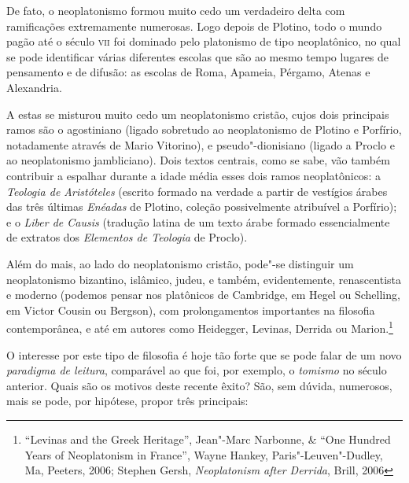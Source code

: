 De fato, o neoplatonismo formou muito cedo um verdadeiro delta com
ramificações extremamente numerosas. Logo depois de Plotino, todo o
mundo pagão até o século \textsc{vii} foi dominado pelo platonismo de tipo
neoplatônico, no qual se pode identificar várias diferentes escolas
que são ao mesmo tempo lugares de pensamento e de difusão: as escolas
de Roma, Apameia, Pérgamo, Atenas e Alexandria.

A estas se misturou muito cedo um neoplatonismo cristão, cujos
dois principais ramos são o agostiniano (ligado sobretudo ao
neoplatonismo de Plotino e Porfírio, notadamente através de Mario
Vitorino), e pseudo"-dionisiano (ligado a Proclo e ao neoplatonismo
jambliciano). Dois textos centrais, como se sabe, vão também
contribuir a espalhar durante a idade média esses dois ramos
neoplatônicos: a \emph{Teologia de Aristóteles} (escrito formado na
verdade a partir de vestígios árabes das três últimas
\emph{Enéadas} de Plotino, coleção possivelmente atribuível a
Porfírio); e o \emph{Liber de Causis} (tradução latina de um texto
árabe formado essencialmente de extratos dos \emph{Elementos de
Teologia} de Proclo).

Além do mais, ao lado do neoplatonismo cristão, pode"-se distinguir
um neoplatonismo bizantino, islâmico, judeu, e também, evidentemente,
renascentista e moderno (podemos pensar nos platônicos de Cambridge,
em Hegel ou Schelling, em Victor Cousin ou Bergson), com
prolongamentos importantes na filosofia contemporânea, e até em autores
como Heidegger, Levinas, Derrida ou
Marion.\footnote{ ``Levinas and the Greek Heritage'', Jean"-Marc Narbonne,
\& ``One Hundred Years of Neoplatonism in France'', Wayne
Hankey, Paris"-Leuven"-Dudley, Ma, Peeters, 2006; Stephen Gersh,
\emph{Neoplatonism after Derrida}, Brill, 2006}

O interesse por este tipo de filosofia é hoje tão forte que se
pode falar de um novo \emph{paradigma de leitura}, comparável ao
que foi, por exemplo, o \emph{tomismo} no século anterior. Quais
são os motivos deste recente êxito? São, sem dúvida, numerosos, mais
se pode, por hipótese, propor três principais:

